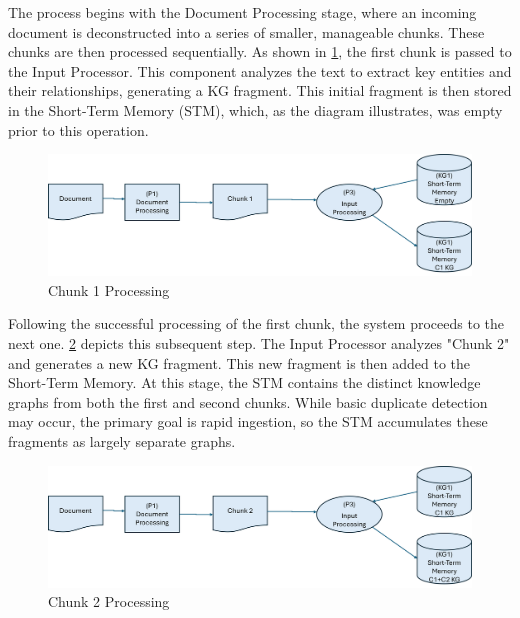 The process begins with the Document Processing stage, where an incoming document is deconstructed into a series of smaller, manageable chunks. These chunks are then processed sequentially. As shown in \cref{fig:chunk_1_processing}, the first chunk is passed to the Input Processor. This component analyzes the text to extract key entities and their relationships, generating a KG fragment. This initial fragment is then stored in the Short-Term Memory (STM), which, as the diagram illustrates, was empty prior to this operation.

\begin{figure}[htp]
    \centering
    \includegraphics[width=\linewidth]{figures/chap3_fig/Chunk 1 Processing.png}
    \caption{Chunk 1 Processing}
    \label{fig:chunk_1_processing}
\end{figure}

Following the successful processing of the first chunk, the system proceeds to the next one. \cref{fig:chunk_2_processing} depicts this subsequent step. The Input Processor analyzes "Chunk 2" and generates a new KG fragment. This new fragment is then added to the Short-Term Memory. At this stage, the STM contains the distinct knowledge graphs from both the first and second chunks. While basic duplicate detection may occur, the primary goal is rapid ingestion, so the STM accumulates these fragments as largely separate graphs.

\begin{figure}[htp]
    \centering
    \includegraphics[width=\linewidth]{figures/chap3_fig/Chunk 2 Processing.png}
    \caption{Chunk 2 Processing}
    \label{fig:chunk_2_processing}
\end{figure}


